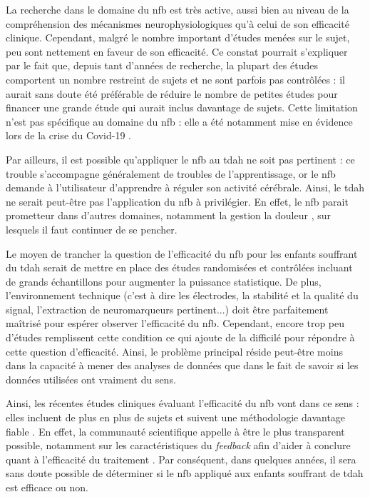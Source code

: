 La recherche dans le domaine du \gls{nfb} est très active, aussi bien au niveau de la compréhension des mécanismes neurophysiologiques 
qu'à celui de son efficacité clinique.
Cependant, malgré le nombre important d'études menées sur le sujet, peu sont nettement en faveur de son efficacité. 
Ce constat pourrait s'expliquer par le fait que, depuis tant d'années de recherche, la plupart des études comportent un nombre
restreint de sujets et ne sont parfois pas contrôlées : il aurait sans doute été préférable de réduire le nombre de petites études pour financer une grande étude
qui aurait inclus davantage de sujets. Cette limitation n'est pas spécifique au domaine du \gls{nfb} : elle a été notamment mise en évidence lors de la crise du 
Covid-19 \citep{Gautret2020, Sanders2020}.

Par ailleurs, il est possible qu'appliquer le \gls{nfb} au \gls{tdah} ne soit pas pertinent : ce trouble s'accompagne généralement de troubles de l'apprentissage,
or le \gls{nfb} demande à l'utilisateur d'apprendre à réguler son activité cérébrale. Ainsi, le \gls{tdah} ne serait peut-être pas l'application du 
\gls{nfb} à privilégier. En effet, le \gls{nfb} parait prometteur dans d'autres domaines, notamment la gestion la douleur \citep{Mayaud2019}, sur lesquels 
il faut continuer de se pencher.

Le moyen de trancher la question de l'efficacité du \gls{nfb} pour les enfants souffrant du \gls{tdah} serait de mettre en place des études randomisées 
et contrôlées incluant de grands échantillons pour augmenter la puissance statistique. De plus, l'environnement technique (c'est à dire 
les électrodes, la stabilité et la qualité du signal, l'extraction de neuromarqueurs pertinent...) doit être parfaitement maîtrisé pour espérer observer
l'efficacité du \gls{nfb}. Cependant, encore trop peu d'études remplissent cette condition ce qui ajoute de la difficilé pour répondre à cette question d'efficacité. 
Ainsi, le problème principal réside peut-être moins dans la capacité à mener des analyses de données que dans le fait de savoir si les données utilisées 
ont vraiment du sens.  

Ainsi, les récentes études cliniques évaluant l'efficacité du \gls{nfb} 
vont dans ce sens : elles incluent de plus en plus de sujets et suivent une méthodologie davantage fiable \citep{Bioulac2019}. 
En effet, la communauté scientifique appelle à être le plus transparent possible, notamment sur les caractéristiques du \textit{feedback} afin d'aider à 
conclure quant à l'efficacité du traitement \citep{Ros2019}. Par conséquent, dans quelques années, il sera sans doute possible de déterminer si le \gls{nfb} 
appliqué aux enfants souffrant de \gls{tdah} est efficace ou non.

